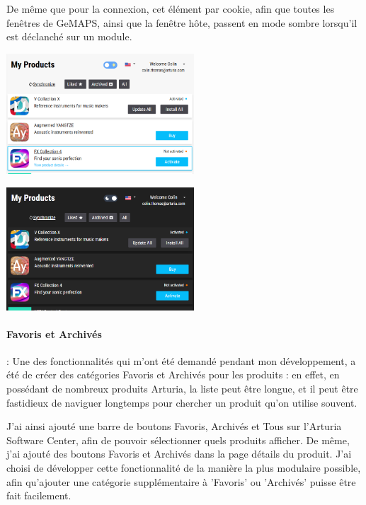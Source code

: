 \documentclass[francais]{rapportPFE}  %
\begin{document}
De même que pour la connexion, cet élément par cookie, afin que toutes les fenêtres de GeMAPS, ainsi que la fenêtre hôte, passent en mode sombre lorsqu'il est déclanché sur un module.

\begin{center}
    \centering
    \begin{minipage}{.5\textwidth}
    \centering
    \includegraphics[width=7cm]{graphics/daymode.png}
    \label{fig:test1}
    \end{minipage}%
    \begin{minipage}{.5\textwidth}
    \centering
    \includegraphics[width=7cm]{graphics/darkmode.png}
    \label{fig:test2}
    \end{minipage}
    \end{center}


\paragraph{Favoris et Archivés}: 
Une des fonctionnalités qui m'ont été demandé pendant mon développement, a été de créer des catégories Favoris et Archivés pour les produits : en effet, en possédant de nombreux produits Arturia, la liste peut être longue, et il peut être fastidieux de naviguer longtemps pour chercher un produit qu'on utilise souvent.

J'ai ainsi ajouté une barre de boutons Favoris, Archivés et Tous sur l'Arturia Software Center, afin de pouvoir sélectionner quels produits afficher.
De même, j'ai ajouté des boutons Favoris et Archivés dans la page détails du produit. 
J'ai choisi de développer cette fonctionnalité de la manière la plus modulaire possible, afin qu'ajouter une catégorie supplémentaire à 'Favoris' ou 'Archivés' puisse être fait facilement.
\end{document}
